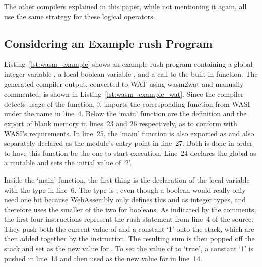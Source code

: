 The other compilers explained in this paper, while not mentioning it again, all use the same strategy for these logical operators.

\subsection{Considering an Example rush Program}


Listing~\ref{lst:wasm_example} shows an example rush program containing a global integer variable , a local boolean variable , and a call to the built-in  function.
The generated compiler output, converted to WAT using wasm2wat and manually commented, is shown in Listing~\ref{lst:wasm_example_wat}.
Since the compiler detects usage of the  function, it imports the corresponding  function from WASI under the name  in line~4.
Below the `main' function are the definition and the export of blank memory in lines~23 and 26 respectively, as to conform with WASI's requirements.
In line~25, the `main' function is also exported as  and also separately declared as the module's entry point in line~27.
Both is done in order to have this function be the one to start execution.
Line~24 declares the global  as a mutable  and sets the initial value of `2'.


Inside the `main' function, the first thing is the declaration of the local variable  with the type  in line~6.
The type is , even though a boolean would really only need one bit because WebAssembly only defines this and  as integer types, and therefore uses the smaller of the two for booleans.
As indicated by the comments, the first four instructions represent the rush statement  from line~4 of the source.
They push both the current value of  and a constant `1' onto the stack, which are then added together by the  instruction.
The resulting sum is then popped off the stack and set as the new value for .
To set the value of  to `true', a constant `1' is pushed in line~13 and then used as the new value for  in line~14.


